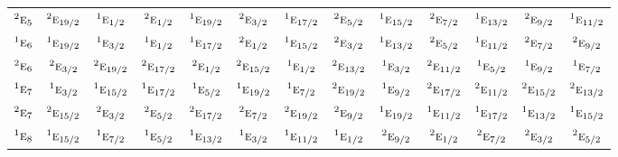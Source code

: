 \documentclass[10pt,a4paper]{article}
\numberwithin{equation}{section}
\newcommand{\irr}[1]{\text{\normalfont\scshape #1}}
\newcommand{\conjpair}[1]{{}^{#1}}
\begin{document}
{\begin{longtable}{@{}lcccccccccccc@{}}
$\conjpair{2}\irr{e}_{5}$ & $\conjpair{2}\irr{e}_{19/2}$ & $\conjpair{1}\irr{e}_{1/2}$ & $\conjpair{2}\irr{e}_{1/2}$ & $\conjpair{1}\irr{e}_{19/2}$ & $\conjpair{2}\irr{e}_{3/2}$ & $\conjpair{1}\irr{e}_{17/2}$ & $\conjpair{2}\irr{e}_{5/2}$ & $\conjpair{1}\irr{e}_{15/2}$ & $\conjpair{2}\irr{e}_{7/2}$ & $\conjpair{1}\irr{e}_{13/2}$ & $\conjpair{2}\irr{e}_{9/2}$ & $\conjpair{1}\irr{e}_{11/2}$\\
$\conjpair{1}\irr{e}_{6}$ & $\conjpair{1}\irr{e}_{19/2}$ & $\conjpair{1}\irr{e}_{3/2}$ & $\conjpair{1}\irr{e}_{1/2}$ & $\conjpair{1}\irr{e}_{17/2}$ & $\conjpair{2}\irr{e}_{1/2}$ & $\conjpair{1}\irr{e}_{15/2}$ & $\conjpair{2}\irr{e}_{3/2}$ & $\conjpair{1}\irr{e}_{13/2}$ & $\conjpair{2}\irr{e}_{5/2}$ & $\conjpair{1}\irr{e}_{11/2}$ & $\conjpair{2}\irr{e}_{7/2}$ & $\conjpair{2}\irr{e}_{9/2}$\\
$\conjpair{2}\irr{e}_{6}$ & $\conjpair{2}\irr{e}_{3/2}$ & $\conjpair{2}\irr{e}_{19/2}$ & $\conjpair{2}\irr{e}_{17/2}$ & $\conjpair{2}\irr{e}_{1/2}$ & $\conjpair{2}\irr{e}_{15/2}$ & $\conjpair{1}\irr{e}_{1/2}$ & $\conjpair{2}\irr{e}_{13/2}$ & $\conjpair{1}\irr{e}_{3/2}$ & $\conjpair{2}\irr{e}_{11/2}$ & $\conjpair{1}\irr{e}_{5/2}$ & $\conjpair{1}\irr{e}_{9/2}$ & $\conjpair{1}\irr{e}_{7/2}$\\
$\conjpair{1}\irr{e}_{7}$ & $\conjpair{1}\irr{e}_{3/2}$ & $\conjpair{1}\irr{e}_{15/2}$ & $\conjpair{1}\irr{e}_{17/2}$ & $\conjpair{1}\irr{e}_{5/2}$ & $\conjpair{1}\irr{e}_{19/2}$ & $\conjpair{1}\irr{e}_{7/2}$ & $\conjpair{2}\irr{e}_{19/2}$ & $\conjpair{1}\irr{e}_{9/2}$ & $\conjpair{2}\irr{e}_{17/2}$ & $\conjpair{2}\irr{e}_{11/2}$ & $\conjpair{2}\irr{e}_{15/2}$ & $\conjpair{2}\irr{e}_{13/2}$\\
$\conjpair{2}\irr{e}_{7}$ & $\conjpair{2}\irr{e}_{15/2}$ & $\conjpair{2}\irr{e}_{3/2}$ & $\conjpair{2}\irr{e}_{5/2}$ & $\conjpair{2}\irr{e}_{17/2}$ & $\conjpair{2}\irr{e}_{7/2}$ & $\conjpair{2}\irr{e}_{19/2}$ & $\conjpair{2}\irr{e}_{9/2}$ & $\conjpair{1}\irr{e}_{19/2}$ & $\conjpair{1}\irr{e}_{11/2}$ & $\conjpair{1}\irr{e}_{17/2}$ & $\conjpair{1}\irr{e}_{13/2}$ & $\conjpair{1}\irr{e}_{15/2}$\\
$\conjpair{1}\irr{e}_{8}$ & $\conjpair{1}\irr{e}_{15/2}$ & $\conjpair{1}\irr{e}_{7/2}$ & $\conjpair{1}\irr{e}_{5/2}$ & $\conjpair{1}\irr{e}_{13/2}$ & $\conjpair{1}\irr{e}_{3/2}$ & $\conjpair{1}\irr{e}_{11/2}$ & $\conjpair{1}\irr{e}_{1/2}$ & $\conjpair{2}\irr{e}_{9/2}$ & $\conjpair{2}\irr{e}_{1/2}$ & $\conjpair{2}\irr{e}_{7/2}$ & $\conjpair{2}\irr{e}_{3/2}$ & $\conjpair{2}\irr{e}_{5/2}$\\

\end{longtable}}
\end{document}
